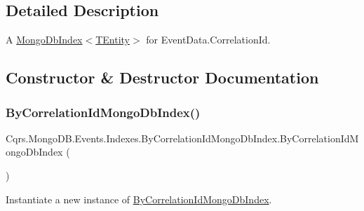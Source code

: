 \subsection{Detailed Description}
A \hyperlink{classCqrs_1_1MongoDB_1_1DataStores_1_1Indexes_1_1MongoDbIndex_a61f4b17dd968f92e81562c70ae062a89_a61f4b17dd968f92e81562c70ae062a89}{Mongo\+Db\+Index$<$\+T\+Entity$>$} for Event\+Data.\+Correlation\+Id. 



\subsection{Constructor \& Destructor Documentation}
\mbox{\label{classCqrs_1_1MongoDB_1_1Events_1_1Indexes_1_1ByCorrelationIdMongoDbIndex_a7bfea0225205a97ffd3501ba5032b5b3_a7bfea0225205a97ffd3501ba5032b5b3}} 
\subsubsection{\texorpdfstring{By\+Correlation\+Id\+Mongo\+Db\+Index()}{ByCorrelationIdMongoDbIndex()}}
{\footnotesize\ttfamily Cqrs.\+Mongo\+D\+B.\+Events.\+Indexes.\+By\+Correlation\+Id\+Mongo\+Db\+Index.\+By\+Correlation\+Id\+Mongo\+Db\+Index (\begin{DoxyParamCaption}{ }\end{DoxyParamCaption})}



Instantiate a new instance of \hyperlink{classCqrs_1_1MongoDB_1_1Events_1_1Indexes_1_1ByCorrelationIdMongoDbIndex}{By\+Correlation\+Id\+Mongo\+Db\+Index}. 

